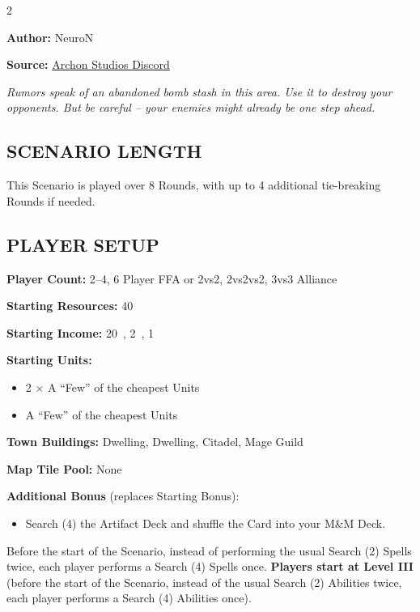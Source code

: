 
\begin{multicols}{2}

\textbf{Author:} NeuroN

\textbf{Source:} \href{https://discord.com/channels/740870068178649108/1278750250722525203/1278750250722525203}{Archon Studios Discord}

\textit{Rumors speak of an abandoned bomb stash in this area.
Use it to destroy your opponents.
But be careful -- your enemies might already be one step ahead.}

\subsection*{\MakeUppercase{Scenario Length}}
This Scenario is played over 8 Rounds, with up to 4 additional tie-breaking Rounds if needed.

\subsection*{\MakeUppercase{Player Setup}}
\textbf{Player Count:} 2--4, 6 Player FFA or 2vs2, 2vs2vs2, 3vs3 Alliance

\textbf{Starting Resources:} 40~

\textbf{Starting Income:} 20~, 2~, 1~

\textbf{Starting Units:}
\begin{itemize}
  \item 2 × A ``Few'' of the cheapest  Units
  \item A ``Few'' of the cheapest  Units
\end{itemize}

\textbf{Town Buildings:}  Dwelling,  Dwelling, Citadel, Mage Guild

\textbf{Map Tile Pool:} None

\textbf{Additional Bonus} (replaces Starting Bonus):

\begin{itemize}
  \item Search (4) the Artifact Deck and shuffle the Card into your M\&M Deck.
\end{itemize}
Before the start of the Scenario, instead of performing the usual Search (2) Spells twice, each player performs a Search (4) Spells once.
\textbf{Players start at Level III} (before the start of the Scenario, instead of the usual Search (2) Abilities twice, each player performs a Search (4) Abilities once).


\end{multicols}

